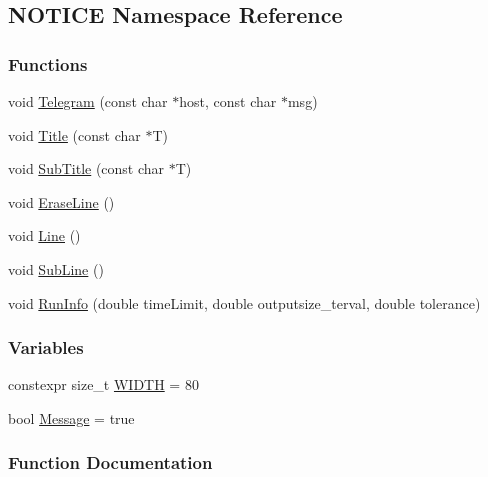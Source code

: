 \hypertarget{namespace_n_o_t_i_c_e}{}\subsection{N\+O\+T\+I\+CE Namespace Reference}
\label{namespace_n_o_t_i_c_e}
\subsubsection*{Functions}
\begin{DoxyCompactItemize}
\item 
void \mbox{\hyperlink{namespace_n_o_t_i_c_e_a7f45e7bbaeb797160d77c7c5dbbb37a6}{Telegram}} (const char $\ast$host, const char $\ast$msg)
\item 
void \mbox{\hyperlink{namespace_n_o_t_i_c_e_a0ddfb0ca7dfa968616d34f4752368bba}{Title}} (const char $\ast$T)
\item 
void \mbox{\hyperlink{namespace_n_o_t_i_c_e_a483b62c015a4211e2716f730ad2c0a44}{Sub\+Title}} (const char $\ast$T)
\item 
void \mbox{\hyperlink{namespace_n_o_t_i_c_e_a46fcf4944d7c1d3cc4d821297b0e4bf8}{Erase\+Line}} ()
\item 
void \mbox{\hyperlink{namespace_n_o_t_i_c_e_a9536e3b7bb1f9b6af83b1a5cdf3a56d3}{Line}} ()
\item 
void \mbox{\hyperlink{namespace_n_o_t_i_c_e_a782778073f9df89a3d20a7faa16494aa}{Sub\+Line}} ()
\item 
void \mbox{\hyperlink{namespace_n_o_t_i_c_e_ab85b7138c5f1deaeeedad94b7bad2477}{Run\+Info}} (double time\+Limit, double outputsize\+\_\+terval, double tolerance)
\end{DoxyCompactItemize}
\subsubsection*{Variables}
\begin{DoxyCompactItemize}
\item 
constexpr size\+\_\+t \mbox{\hyperlink{namespace_n_o_t_i_c_e_a31f6fb221f22faf96b9cfb05315d1d3e}{W\+I\+D\+TH}} = 80
\item 
bool \mbox{\hyperlink{namespace_n_o_t_i_c_e_a4de9d52506c4de1641e95f4f53669e3f}{Message}} = true
\end{DoxyCompactItemize}


\subsubsection{Function Documentation}
\mbox{\label{namespace_n_o_t_i_c_e_a46fcf4944d7c1d3cc4d821297b0e4bf8}} 
